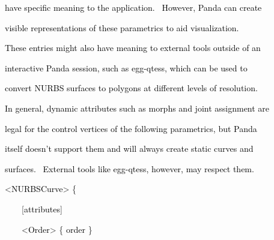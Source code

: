 \documentclass[a4paper]{article}
\newcommand\textstyleOOoComputerKeyWord[1]{\textrm{\textcolor[rgb]{0.0,0.0,0.5019608}{#1}}}
\newcommand\textstyleOOoAssemblerSpecialChar[1]{\textrm{\textcolor[rgb]{0.0,0.5019608,0.0}{#1}}}
\newcommand\textstyleOOoAssemblerIdent[1]{\textrm{\textcolor{black}{#1}}}
\begin{document}
{\color{black}
\textstyleOOoComputerKeyWord{\textcolor{black}{have specific meaning to the application. \ However, Panda can create}}}

{\color{black}
\textstyleOOoComputerKeyWord{\textcolor{black}{visible representations of these parametrics to aid visualization.}}}


\bigskip

{\color{black}
\textstyleOOoComputerKeyWord{\textcolor{black}{These entries might also have meaning to external tools outside of an}}}

{\color{black}
\textstyleOOoComputerKeyWord{\textcolor{black}{interactive Panda session, such as egg-qtess, which can be used to}}}

{\color{black}
\textstyleOOoComputerKeyWord{\textcolor{black}{convert NURBS surfaces to polygons at different levels of resolution.}}}


\bigskip

{\color{black}
\textstyleOOoComputerKeyWord{\textcolor{black}{In general, dynamic attributes such as morphs and joint assignment are}}}

{\color{black}
\textstyleOOoComputerKeyWord{\textcolor{black}{legal for the control vertices of the following parametrics, but Panda}}}

{\color{black}
\textstyleOOoComputerKeyWord{\textcolor{black}{itself doesn't support them and will always create static curves and}}}

{\color{black}
\textstyleOOoComputerKeyWord{\textcolor{black}{surfaces. \ External tools like egg-qtess, however, may respect them.}}}


\bigskip

{\color{black}
\textstyleOOoAssemblerSpecialChar{{\textless}}\textstyleOOoAssemblerIdent{NURBSCurve}\textstyleOOoAssemblerSpecialChar{{\textgreater}}\textstyleOOoComputerKeyWord{\textcolor{black}{
}}\textstyleOOoAssemblerSpecialChar{\{}}

{\color{black}
\textstyleOOoComputerKeyWord{\textcolor{black}{\ \ \ \ }}\textstyleOOoAssemblerSpecialChar{[}\textstyleOOoAssemblerIdent{attributes}\textstyleOOoAssemblerSpecialChar{]}\textstyleOOoComputerKeyWord{\textcolor{black}{
}}}


\bigskip

{\color{black}
\textstyleOOoComputerKeyWord{\textcolor{black}{\ \ \ \ }}\textstyleOOoAssemblerSpecialChar{{\textless}}\textstyleOOoAssemblerIdent{Order}\textstyleOOoAssemblerSpecialChar{{\textgreater}}\textstyleOOoComputerKeyWord{\textcolor{black}{
}}\textstyleOOoAssemblerSpecialChar{\{}\textstyleOOoComputerKeyWord{\textcolor{black}{
}}\textstyleOOoAssemblerIdent{order}\textstyleOOoComputerKeyWord{\textcolor{black}{
}}\textstyleOOoAssemblerSpecialChar{\}}}
\end{document}
